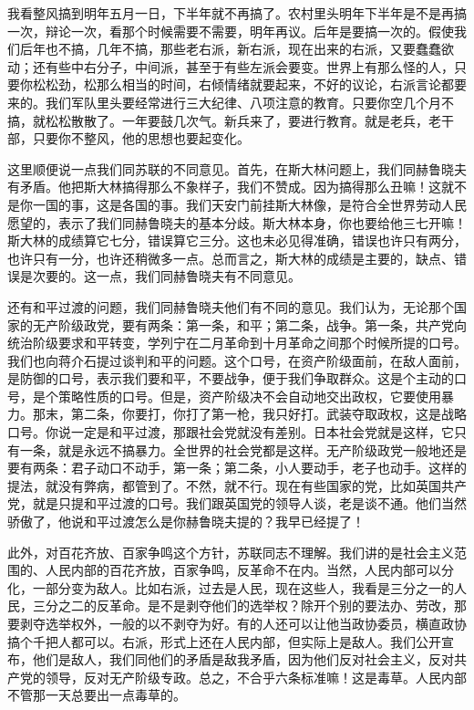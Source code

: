 我看整风搞到明年五月一日，下半年就不再搞了。农村里头明年下半年是不是再搞一次，辩论一次，看那个时候需要不需要，明年再议。后年是要搞一次的。假使我们后年也不搞，几年不搞，那些老右派，新右派，现在出来的右派，又要蠢蠢欲动；还有些中右分子，中间派，甚至于有些左派会要变。世界上有那么怪的人，只要你松松劲，松那么相当的时间，右倾情绪就要起来，不好的议论，右派言论都要来的。我们军队里头要经常进行三大纪律、八项注意的教育。只要你空几个月不搞，就松松散散了。一年要鼓几次气。新兵来了，要进行教育。就是老兵，老干部，只要你不整风，他的思想也要起变化。

这里顺便说一点我们同苏联的不同意见。首先，在斯大林问题上，我们同赫鲁晓夫有矛盾。他把斯大林搞得那么不象样子，我们不赞成。因为搞得那么丑嘛！这就不是你一国的事，这是各国的事。我们天安门前挂斯大林像，是符合全世界劳动人民愿望的，表示了我们同赫鲁晓夫的基本分歧。斯大林本身，你也要给他三七开嘛！斯大林的成绩算它七分，错误算它三分。这也未必见得准确，错误也许只有两分，也许只有一分，也许还稍微多一点。总而言之，斯大林的成绩是主要的，缺点、错误是次要的。这一点，我们同赫鲁晓夫有不同意见。

还有和平过渡的问题，我们同赫鲁晓夫他们有不同的意见。我们认为，无论那个国家的无产阶级政党，要有两条：第一条，和平；第二条，战争。第一条，共产党向统治阶级要求和平转变，学列宁在二月革命到十月革命之间那个时候所提的口号。我们也向蒋介石提过谈判和平的问题。这个口号，在资产阶级面前，在敌人面前，是防御的口号，表示我们要和平，不要战争，便于我们争取群众。这是个主动的口号，是个策略性质的口号。但是，资产阶级决不会自动地交出政权，它要使用暴力。那末，第二条，你要打，你打了第一枪，我只好打。武装夺取政权，这是战略口号。你说一定是和平过渡，那跟社会党就没有差别。日本社会党就是这样，它只有一条，就是永远不搞暴力。全世界的社会党都是这样。无产阶级政党一般地还是要有两条：君子动口不动手，第一条；第二条，小人要动手，老子也动手。这样的提法，就没有弊病，都管到了。不然，就不行。现在有些国家的党，比如英国共产党，就是只提和平过渡的口号。我们跟英国党的领导人谈，老是谈不通。他们当然骄傲了，他说和平过渡怎么是你赫鲁晓夫提的？我早已经提了！

此外，对百花齐放、百家争鸣这个方针，苏联同志不理解。我们讲的是社会主义范围的、人民内部的百花齐放，百家争鸣，反革命不在内。当然，人民内部可以分化，一部分变为敌人。比如右派，过去是人民，现在这些人，我看是三分之一的人民，三分之二的反革命。是不是剥夺他们的选举权？除开个别的要法办、劳改，那要剥夺选举权外，一般的以不剥夺为好。有的人还可以让他当政协委员，横直政协搞个千把人都可以。右派，形式上还在人民内部，但实际上是敌人。我们公开宣布，他们是敌人，我们同他们的矛盾是敌我矛盾，因为他们反对社会主义，反对共产党的领导，反对无产阶级专政。总之，不合乎六条标准嘛！这是毒草。人民内部不管那一天总要出一点毒草的。

